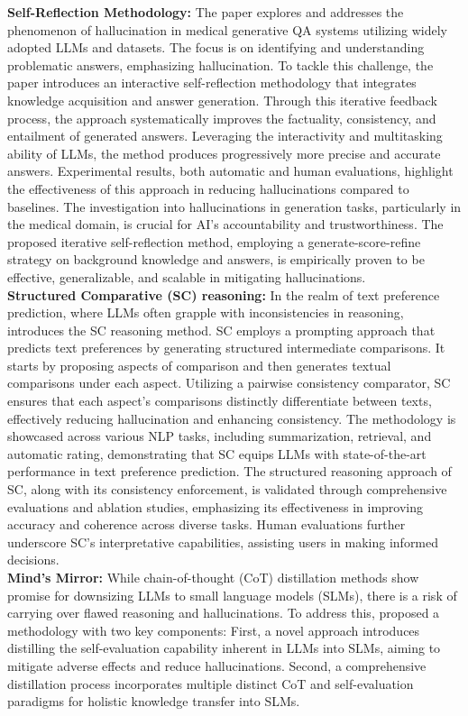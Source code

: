 \documentclass[11pt]{article}
\begin{document}
\textbf{Self-Reflection Methodology:} The paper \cite{ji2023mitigating} explores and addresses the phenomenon of hallucination in medical generative QA systems utilizing widely adopted LLMs and datasets. The focus is on identifying and understanding problematic answers, emphasizing hallucination.
To tackle this challenge, the paper introduces an interactive self-reflection methodology that integrates knowledge acquisition and answer generation. Through this iterative feedback process, the approach systematically improves the factuality, consistency, and entailment of generated answers. Leveraging the interactivity and multitasking ability of LLMs, the method produces progressively more precise and accurate answers. Experimental results, both automatic and human evaluations, highlight the effectiveness of this approach in reducing hallucinations compared to baselines.
The investigation into hallucinations in generation tasks, particularly in the medical domain, is crucial for AI's accountability and trustworthiness. The proposed iterative self-reflection method, employing a generate-score-refine strategy on background knowledge and answers, is empirically proven to be effective, generalizable, and scalable in mitigating hallucinations. \\
\textbf{Structured Comparative (SC) reasoning:} In the realm of text preference prediction, where LLMs often grapple with inconsistencies in reasoning, \cite{yan2023basis} introduces the SC reasoning method. SC employs a prompting approach that predicts text preferences by generating structured intermediate comparisons. It starts by proposing aspects of comparison and then generates textual comparisons under each aspect. Utilizing a pairwise consistency comparator, SC ensures that each aspect's comparisons distinctly differentiate between texts, effectively reducing hallucination and enhancing consistency. The methodology is showcased across various NLP tasks, including summarization, retrieval, and automatic rating, demonstrating that SC equips LLMs with state-of-the-art performance in text preference prediction. The structured reasoning approach of SC, along with its consistency enforcement, is validated through comprehensive evaluations and ablation studies, emphasizing its effectiveness in improving accuracy and coherence across diverse tasks. Human evaluations further underscore SC's interpretative capabilities, assisting users in making informed decisions. \\
\textbf{Mind’s Mirror:} While chain-of-thought (CoT) distillation methods show promise for downsizing LLMs to small language models (SLMs), there is a risk of carrying over flawed reasoning and hallucinations. To address this, \cite{liu2023minds} proposed a methodology with two key components: First, a novel approach introduces distilling the self-evaluation capability inherent in LLMs into SLMs, aiming to mitigate adverse effects and reduce hallucinations. Second, a comprehensive distillation process incorporates multiple distinct CoT and self-evaluation paradigms for holistic knowledge transfer into SLMs.
\end{document}
